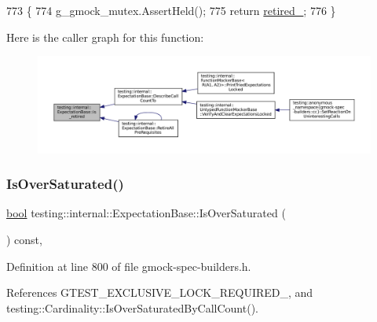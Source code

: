 \begin{DoxyCode}
773                                                     \{
774     g\_gmock\_mutex.AssertHeld();
775     \textcolor{keywordflow}{return} \hyperlink{classtesting_1_1internal_1_1ExpectationBase_a0afd852f5d7863effc3d304dac6a44cf}{retired\_};
776   \}
\end{DoxyCode}
Here is the caller graph for this function\+:
\nopagebreak
\begin{figure}[H]
\begin{center}
\leavevmode
\includegraphics[width=350pt]{classtesting_1_1internal_1_1ExpectationBase_afe539dbc5b29d9635403767a4708c476_icgraph}
\end{center}
\end{figure}
\mbox{\label{classtesting_1_1internal_1_1ExpectationBase_a080dab35ecc6c57096f50758a0e8123d}} 
\subsubsection{\texorpdfstring{Is\+Over\+Saturated()}{IsOverSaturated()}}
{\footnotesize\ttfamily \hyperlink{classbool}{bool} testing\+::internal\+::\+Expectation\+Base\+::\+Is\+Over\+Saturated (\begin{DoxyParamCaption}{ }\end{DoxyParamCaption}) const\hspace{0.3cm}{\ttfamily [inline]}, {\ttfamily [protected]}}



Definition at line 800 of file gmock-\/spec-\/builders.\+h.



References G\+T\+E\+S\+T\+\_\+\+E\+X\+C\+L\+U\+S\+I\+V\+E\+\_\+\+L\+O\+C\+K\+\_\+\+R\+E\+Q\+U\+I\+R\+E\+D\+\_\+, and testing\+::\+Cardinality\+::\+Is\+Over\+Saturated\+By\+Call\+Count().



